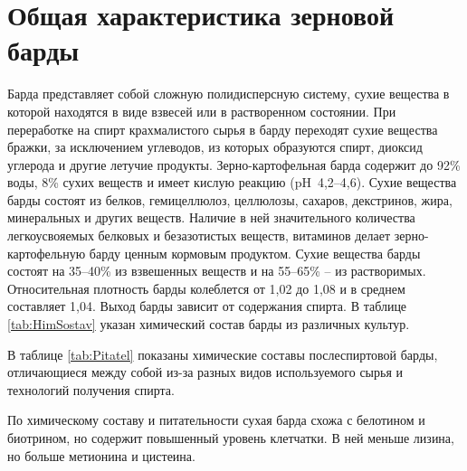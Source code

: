 \section{Общая характеристика зерновой барды}

Барда представляет собой сложную полидисперсную систему, сухие вещества в которой находятся в виде взвесей или в растворенном состоянии.
При переработке на спирт крахмалистого сырья в барду переходят сухие вещества бражки, за исключением углеводов, из которых образуются спирт, диоксид углерода и другие летучие продукты.
Зерно-картофельная барда содержит до 92\% воды, 8\% сухих веществ и имеет кислую реакцию (pH~4,2--4,6).
Сухие вещества барды состоят из белков, гемицеллюлоз, целлюлозы, сахаров, декстринов, жира, минеральных и других веществ.
Наличие в ней значительного количества легкоусвояемых белковых и безазотистых веществ, витаминов делает зерно-картофельную барду ценным кормовым продуктом.
Сухие вещества барды состоят на 35--40\% из взвешенных веществ и на 55--65\% -- из растворимых.
Относительная плотность барды колеблется от 1,02 до 1,08 и в среднем составляет 1,04.
Выход барды зависит от содержания спирта.
В таблице \ref{tab:HimSostav} указан химический состав барды из различных культур.


В таблице \ref{tab:Pitatel} показаны химические составы послеспиртовой барды, отличающиеся между собой из-за разных видов используемого сырья и технологий получения спирта.


По химическому составу и питательности сухая барда схожа с белотином и биотрином, но содержит повышенный уровень клетчатки.
В ней меньше лизина, но больше метионина и цистеина.

